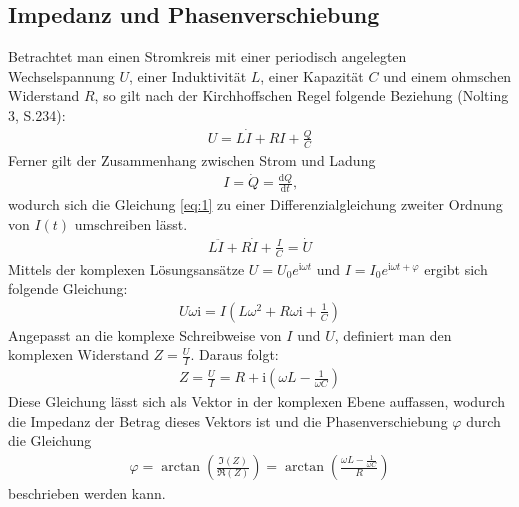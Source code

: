 \subsection{Impedanz und Phasenverschiebung}
%
Betrachtet man einen Stromkreis mit einer periodisch angelegten Wechselspannung $U$, einer Induktivität $L$, einer Kapazität $C$ und einem ohmschen Widerstand $R$, so gilt nach der Kirchhoffschen Regel folgende Beziehung (Nolting 3, S.234): 
%
\begin{align}
	U = L\dot{I}+RI+\frac{Q}{C} 
	\label{eq:1}
\end{align}
%
Ferner gilt der Zusammenhang zwischen Strom und Ladung
%
\begin{align}
	I = \dot{Q} = \frac{\text{d}Q}{\text{d}t}\text{,}
\end{align}
%
wodurch sich die Gleichung \ref{eq:1} zu einer Differenzialgleichung zweiter Ordnung von $I(t)$ umschreiben lässt.
%
\begin{align}
	L\ddot{I}+R\dot{I}+\frac{I}{C}= \dot{U}
\end{align}
%
Mittels der komplexen Lösungsansätze $U = U_0 e^{\text{i}\omega t}$ und $I = I_0 e^{\text{i}\omega t+\varphi}$ ergibt sich folgende Gleichung:
%
\begin{align}
	U\omega \text{i} = I(L\omega^2+R\omega \text{i}+\frac{1}{C})
\end{align}
%
Angepasst an die komplexe Schreibweise von $I$ und $U$, definiert man den komplexen Widerstand $Z=\frac{U}{I}$. Daraus folgt:
%
\begin{align}
	Z = \frac{U}{I} = R+\text{i}\left(\omega L - \frac{1}{\omega C}\right)
\end{align}
%
Diese Gleichung lässt sich als Vektor in der komplexen Ebene auffassen, wodurch die Impedanz der Betrag dieses Vektors ist und die Phasenverschiebung $\varphi$ durch die Gleichung 
%
\begin{align}
	\varphi = \arctan\left(\frac{\Im(Z)}{\Re(Z)}\right) = \arctan\left(\frac{\omega L - \frac{1}{\omega C}}{R}\right)
\end{align}
%
beschrieben werden kann.
